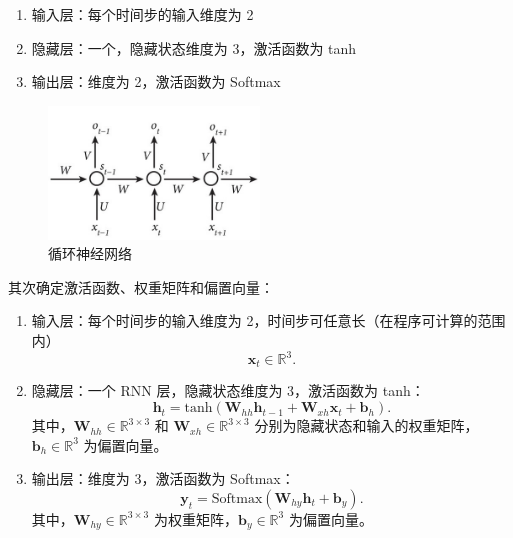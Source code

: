 \begin{enumerate}
  \item 输入层：每个时间步的输入维度为 2
  \item 隐藏层：一个，隐藏状态维度为 3，激活函数为 tanh
  \item 输出层：维度为 2，激活函数为 Softmax
\end{enumerate}

\begin{figure}[htbp]
  \centering
  \includegraphics[width=0.5\textwidth]{figures/rnn.jpeg}
  \caption{循环神经网络}
  \label{fig:example}
\end{figure}

其次确定激活函数、权重矩阵和偏置向量：

\begin{enumerate}

  \item 输入层：每个时间步的输入维度为 2，时间步可任意长（在程序可计算的范围内）
        \begin{equation}
          \mathbf{x}_t \in \mathbb{R}^{3}.
        \end{equation}

  \item 隐藏层：一个 RNN 层，隐藏状态维度为 3，激活函数为 tanh：
        \begin{equation}
          \mathbf{h}_t = \text{tanh}(\mathbf{W}_{hh} \mathbf{h}_{t-1} + \mathbf{W}_{xh} \mathbf{x}_t + \mathbf{b}_h).
        \end{equation}
        其中，\(\mathbf{W}_{hh} \in \mathbb{R}^{3 \times 3}\) 和 \(\mathbf{W}_{xh} \in \mathbb{R}^{3 \times 3}\) 分别为隐藏状态和输入的权重矩阵，\(\mathbf{b}_h \in \mathbb{R}^{3}\) 为偏置向量。

  \item 输出层：维度为 3，激活函数为 Softmax：
        \begin{equation}
          \mathbf{y}_t = \text{Softmax}(\mathbf{W}_{hy} \mathbf{h}_t + \mathbf{b}_y).
        \end{equation}
        其中，\(\mathbf{W}_{hy} \in \mathbb{R}^{3 \times 3}\) 为权重矩阵，\(\mathbf{b}_y \in \mathbb{R}^{3}\) 为偏置向量。

\end{enumerate}

